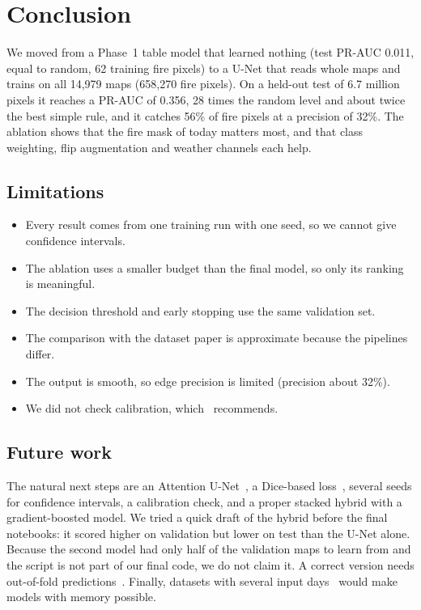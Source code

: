 \documentclass[10pt,letterpaper,twocolumn]{article}
\begin{document}
\section{Conclusion}
We moved from a Phase~1 table model that learned nothing (test PR-AUC 0.011,
equal to random, 62 training fire pixels) to a U-Net that reads whole maps and
trains on all 14,979 maps (658,270 fire pixels). On a held-out test of 6.7 million
pixels it reaches a PR-AUC of 0.356, 28 times the random level and about twice the
best simple rule, and it catches 56\% of fire pixels at a precision of 32\%. The
ablation shows that the fire mask of today matters most, and that class
weighting, flip augmentation and weather channels each help.

\subsection{Limitations}
\begin{itemize}
  \item Every result comes from one training run with one seed, so we cannot give
        confidence intervals.
  \item The ablation uses a smaller budget than the final model, so only its
        ranking is meaningful.
  \item The decision threshold and early stopping use the same validation set.
  \item The comparison with the dataset paper is approximate because the
        pipelines differ.
  \item The output is smooth, so edge precision is limited (precision about 32\%).
  \item We did not check calibration, which~\cite{kumar2025} recommends.
\end{itemize}

\subsection{Future work}
The natural next steps are an Attention U-Net~\cite{oktay2018}, a Dice-based
loss~\cite{milletari2016}, several seeds for confidence intervals, a calibration
check, and a proper stacked hybrid with a gradient-boosted model. We tried a quick
draft of the hybrid before the final notebooks: it scored higher on validation but
lower on test than the U-Net alone. Because the second model had only half of the
validation maps to learn from and the script is not part of our final code, we do
not claim it. A correct version needs out-of-fold predictions~\cite{wolpert1992}.
Finally, datasets with several input days~\cite{gerard2023} would make models with
memory possible.
\end{document}
